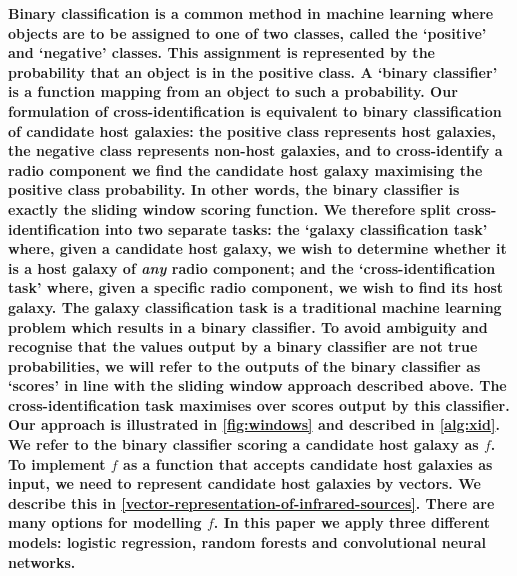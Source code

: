 \documentclass[fleqn,usenatbib,usedcolumn]{mnras}
\newcommand{\edited}[1]{{\bf {#1}}}
\begin{document}
    \edited{Binary classification is a common method in machine learning
    where objects are to be assigned to one of two classes,
    called the `positive' and `negative' classes. This assignment is
    represented by the probability that an object is in the positive class. A
    `binary classifier' is a function mapping from an object to such a
    probability. Our formulation of cross-identification is equivalent to
    binary classification of candidate host galaxies: the positive class
    represents host galaxies, the negative class represents non-host galaxies,
    and to cross-identify a radio component we find the candidate host galaxy
    maximising the positive class probability. In other words,
    the binary classifier is exactly the sliding window scoring function. We therefore split
    cross-identification into two separate tasks: the `galaxy
    classification task' where, given a candidate host galaxy, we wish to
    determine whether it is a host galaxy of \emph{any} radio component; and
    the `cross-identification task' where, given a specific radio
    component, we wish to find its host galaxy. The galaxy classification task
    is a traditional machine learning problem which results in a binary
    classifier. To avoid ambiguity and recognise that the values output by a
    binary classifier are not true probabilities, we will refer to the outputs
    of the binary classifier as `scores' in line with the sliding window approach
    described above. The cross-identification task maximises over scores
    output by this classifier. Our approach is illustrated in
    \autoref{fig:windows} and described in \autoref{alg:xid}. We refer to the
    binary classifier scoring a candidate host galaxy as
    $f$. To implement $f$ as a function that accepts candidate host galaxies
    as input, we need to represent candidate host galaxies by vectors. We
    describe this in \autoref{vector-representation-of-infrared-sources}.
    There are many options for modelling $f$. In this paper we apply three
    different models: logistic regression, random forests and convolutional
    neural networks.}
\end{document}
